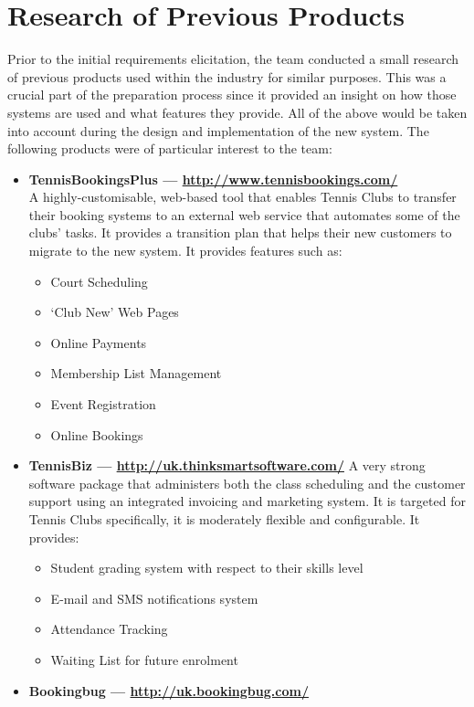\documentclass{l3proj}
\begin{document}
\section{Research of Previous Products}
\par
Prior to the initial requirements elicitation, the team conducted a small research of previous products used within the industry for similar purposes. This was a crucial part of the preparation process since it provided an insight on how those systems are used and what features they provide. All of the above would be taken into account during the design and implementation of the new system. The following products were of particular interest to the team:
\begin{itemize}
\item \textbf{TennisBookingsPlus --- \url{http://www.tennisbookings.com/}}\\
A highly-customisable, web-based tool that enables Tennis Clubs to transfer their booking systems to an external web service that automates some of the clubs' tasks. It provides a transition plan that helps their new customers to migrate to the new system. It provides features such as:
		\begin{itemize}
	\item Court Scheduling
	\item `Club New' Web Pages
	\item Online Payments
	\item Membership List Management
	\item Event Registration
	\item Online Bookings
		\end{itemize}
\item \textbf{TennisBiz --- \url{http://uk.thinksmartsoftware.com/}}
A very strong software package that administers both the class scheduling and the customer support using an integrated invoicing and marketing system. It is targeted for Tennis Clubs specifically, it is moderately flexible and configurable. It provides:
		\begin{itemize}
	\item Student grading system with respect to their skills level
	\item E-mail and SMS notifications system
	\item Attendance Tracking
	\item Waiting List for future enrolment
		\end{itemize}
\item \textbf{Bookingbug --- \url{http://uk.bookingbug.com/}}

\end{itemize}
\end{document}

